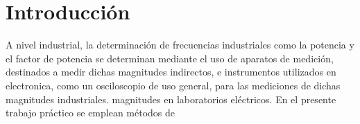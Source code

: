\section{Introducción}

   A nivel industrial, la determinación de frecuencias industriales como la potencia y el factor de potencia se 
   determinan mediante el uso de aparatos de medición, destinados a medir dichas magnitudes 
   indirectos, e instrumentos utilizados en electronica, como un osciloscopio de uso general, 
   para las mediciones de dichas magnitudes industriales.   
   magnitudes en laboratorios eléctricos. En el presente trabajo práctico se emplean métodos de

